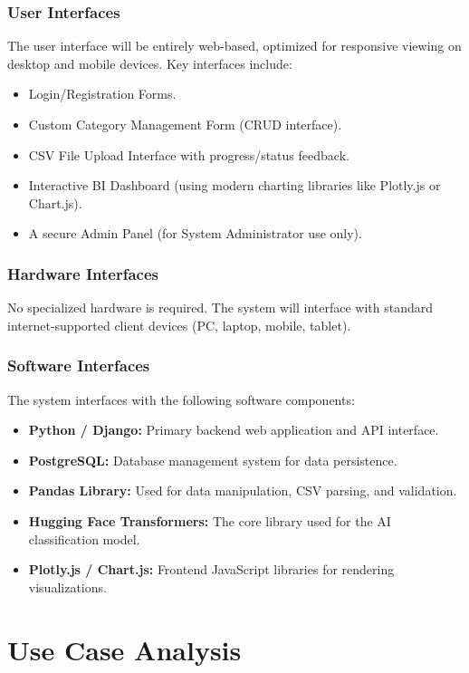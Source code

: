 \documentclass[11pt,a4paper]{report}
\begin{document}
\subsection{User Interfaces}
The user interface will be entirely web-based, optimized for responsive viewing on desktop and mobile devices. Key interfaces include:
\begin{itemize}
	\item Login/Registration Forms.
	\item Custom Category Management Form (CRUD interface).
	\item CSV File Upload Interface with progress/status feedback.
	\item Interactive BI Dashboard (using modern charting libraries like Plotly.js or Chart.js).
	\item A secure Admin Panel (for System Administrator use only).
\end{itemize}

\subsection{Hardware Interfaces}
No specialized hardware is required. The system will interface with standard internet-supported client devices (PC, laptop, mobile, tablet).

\subsection{Software Interfaces}
The system interfaces with the following software components:
\begin{itemize}
	\item \textbf{Python / Django:} Primary backend web application and API interface.
	\item \textbf{PostgreSQL:} Database management system for data persistence.
	\item \textbf{Pandas Library:} Used for data manipulation, CSV parsing, and validation.
	\item \textbf{Hugging Face Transformers:} The core library used for the AI classification model.
	\item \textbf{Plotly.js / Chart.js:} Frontend JavaScript libraries for rendering visualizations.
\end{itemize}

\chapter{Use Case Analysis}
\end{document}
